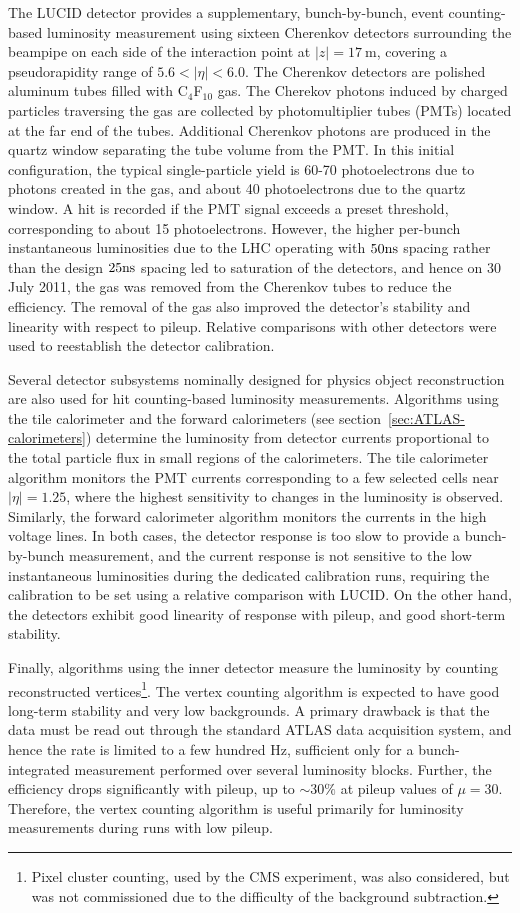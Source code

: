 The LUCID detector provides a supplementary, bunch-by-bunch, event counting-based luminosity measurement using sixteen Cherenkov detectors surrounding the beampipe on each side of the interaction point at $|z|=17~\mbox{m}$, covering a pseudorapidity range of $5.6<|\eta|<6.0$. The Cherenkov detectors are polished aluminum tubes filled with C$_4$F$_{10}$ gas. The Cherekov photons induced by charged particles traversing the gas are collected by photomultiplier tubes (PMTs) located at the far end of the tubes. Additional Cherenkov photons are produced in the quartz window separating the tube volume from the PMT. In this initial configuration, the typical single-particle yield is 60-70 photoelectrons due to photons created in the gas, and about 40 photoelectrons due to the quartz window. A hit is recorded if the PMT signal exceeds a preset threshold, corresponding to about 15 photoelectrons. However, the higher per-bunch instantaneous luminosities due to the LHC operating with $50 \mathrm{ns}$ spacing rather than the design $25 \mathrm{ns}$ spacing led to saturation of the detectors, and hence on 30 July 2011, the gas was removed from the Cherenkov tubes to reduce the efficiency. The removal of the gas also improved the detector's stability and linearity with respect to pileup. Relative comparisons with other detectors were used to reestablish the detector calibration.

Several detector subsystems nominally designed for physics object reconstruction are also used for hit counting-based luminosity measurements. Algorithms using the tile calorimeter and the forward calorimeters (see section~\ref{sec:ATLAS-calorimeters}) determine the luminosity from detector currents proportional to the total particle flux in small regions of the calorimeters. The tile calorimeter algorithm monitors the PMT currents corresponding to a few selected cells near $|\eta|=1.25$, where the highest sensitivity to changes in the luminosity is observed. Similarly, the forward calorimeter algorithm monitors the currents in the high voltage lines. In both cases, the detector response is too slow to provide a bunch-by-bunch measurement, and the current response is not sensitive to the low instantaneous luminosities during the dedicated calibration runs, requiring the calibration to be set using a relative comparison with LUCID. On the other hand, the detectors exhibit good linearity of response with pileup, and good short-term stability. 

Finally, algorithms using the inner detector measure the luminosity by counting reconstructed vertices\footnote{Pixel cluster counting, used by the CMS experiment, was also considered, but was not commissioned due to the difficulty of the background subtraction.}. The vertex counting algorithm is expected to have good long-term stability and very low backgrounds. A primary drawback is that the data must be read out through the standard ATLAS data acquisition system, and hence the rate is limited to a few hundred Hz, sufficient only for a bunch-integrated measurement performed over several luminosity blocks. Further, the efficiency drops significantly with pileup, up to $\sim30\%$ at pileup values of $\mu=30$. Therefore, the vertex counting algorithm is useful primarily for luminosity measurements during runs with low pileup. 


